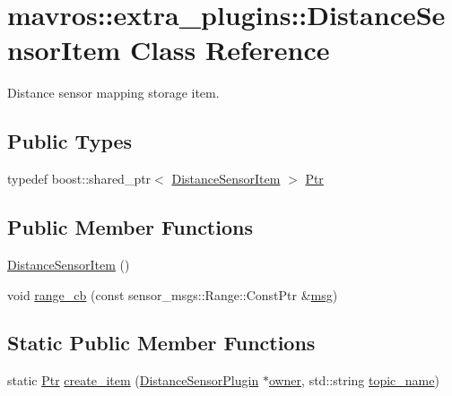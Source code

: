 \hypertarget{classmavros_1_1extra__plugins_1_1DistanceSensorItem}{}\section{mavros\+::extra\+\_\+plugins\+::Distance\+Sensor\+Item Class Reference}
\label{classmavros_1_1extra__plugins_1_1DistanceSensorItem}


Distance sensor mapping storage item.  


\subsection*{Public Types}
\begin{DoxyCompactItemize}
\item 
typedef boost\+::shared\+\_\+ptr$<$ \mbox{\hyperlink{classmavros_1_1extra__plugins_1_1DistanceSensorItem}{Distance\+Sensor\+Item}} $>$ \mbox{\hyperlink{group__plugin_ga0156f4cebc73c6f4b88d5a4053e98c2b}{Ptr}}
\end{DoxyCompactItemize}
\subsection*{Public Member Functions}
\begin{DoxyCompactItemize}
\item 
\mbox{\hyperlink{group__plugin_ga4a5d2662de657c6d326a0e3dc697d889}{Distance\+Sensor\+Item}} ()
\item 
void \mbox{\hyperlink{group__plugin_ga57b6fa996ec369d2474ff69c77434917}{range\+\_\+cb}} (const sensor\+\_\+msgs\+::\+Range\+::\+Const\+Ptr \&\mbox{\hyperlink{stratnode_8cpp_a82cfe4ed9bc9e1b07c8bf209c324d85b}{msg}})
\end{DoxyCompactItemize}
\subsection*{Static Public Member Functions}
\begin{DoxyCompactItemize}
\item 
static \mbox{\hyperlink{group__plugin_ga0156f4cebc73c6f4b88d5a4053e98c2b}{Ptr}} \mbox{\hyperlink{group__plugin_gae1634c431193fc47e5f577b9e326ea0b}{create\+\_\+item}} (\mbox{\hyperlink{classmavros_1_1extra__plugins_1_1DistanceSensorPlugin}{Distance\+Sensor\+Plugin}} $\ast$\mbox{\hyperlink{group__plugin_ga4f45665ceec645c00b6692388d8c0d51}{owner}}, std\+::string \mbox{\hyperlink{group__plugin_gaec60262d11a7bb202f471aa4d6608615}{topic\+\_\+name}})
\end{DoxyCompactItemize}
